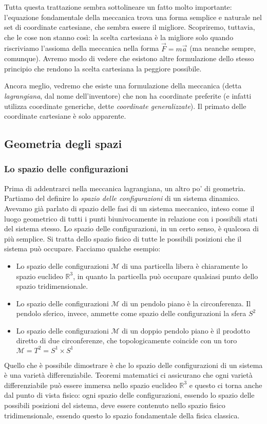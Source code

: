 \documentclass[a4paper,openany]{article}
\begin{document}
	Tutta questa trattazione sembra sottolineare un fatto molto importante: l'equazione fondamentale della meccanica trova una forma semplice e naturale nel set di coordinate cartesiane, che sembra essere il migliore. Scopriremo, tuttavia, che le cose non stanno così: la scelta cartesiana è la migliore solo quando riscriviamo l'assioma della meccanica nella forma $\vec{F}=m\vec{a}$ (ma neanche sempre, comunque). Avremo modo di vedere che esistono altre formulazione dello stesso principio che rendono la scelta cartesiana la peggiore possibile.
	
	
	Ancora meglio, vedremo che esiste una formulazione della meccanica (detta \textit{lagrangiana}, dal nome dell'inventore) che non ha coordinate preferite (e infatti utilizza coordinate generiche, dette \textit{coordinate generalizzate}). Il primato delle coordinate cartesiane è solo apparente.
	\subsection{Geometria degli spazi}
	\subsubsection{Lo spazio delle configurazioni}
	Prima di addentrarci nella meccanica lagrangiana, un altro po' di geometria. Partiamo del definire lo \textit{spazio delle configurazioni} di un sistema dinamico. Avevamo già parlato di spazio delle fasi di un sistema meccanico, inteso come il luogo geometrico di tutti i punti biunivocamente in relazione con i possibili stati del sistema stesso. Lo spazio delle configurazioni, in un certo senso, è qualcosa di più semplice. Si tratta dello spazio fisico di tutte le possibili posizioni che il sistema può occupare. Facciamo qualche esempio:
	\begin{itemize}
		\item Lo spazio delle configurazioni $\mathcal{M}$ di una particella libera è chiaramente lo spazio euclideo $\mathbb{R}^{3}$, in quanto la particella può occupare qualsiasi punto dello spazio tridimensionale.
		\item Lo spazio delle configurazioni $\mathcal{M}$ di un pendolo piano è la circonferenza. Il pendolo sferico, invece, ammette come spazio delle configurazioni la sfera $S^{2}$
		\item Lo spazio delle configurazioni $\mathcal{M}$ di un doppio pendolo piano è il prodotto diretto di due circonferenze, che topologicamente coincide con un toro $\mathcal{M} = T^2 = S^{1} \times S^1$
	\end{itemize}
	Quello che è possibile dimostrare è che lo spazio delle configurazioni di un sistema è una varietà differenziabile. Teoremi matematici ci assicurano che ogni varietà differenziabile può essere immersa nello spazio euclideo $\mathbb{R}^3$ e questo ci torna anche dal punto di vista fisico: ogni spazio delle configurazioni, essendo lo spazio delle possibili posizioni del sistema, deve essere contenuto nello spazio fisico tridimensionale, essendo questo lo spazio fondamentale della fisica classica.
	
\end{document}
